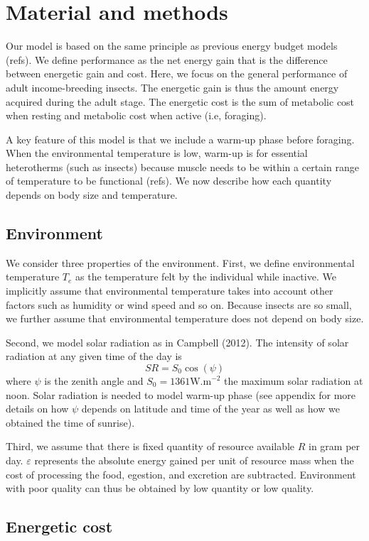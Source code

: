 \section*{Material and methods}
Our model is based on the same principle as previous energy budget models (refs).
We define performance as the net energy gain that is the difference between energetic gain and cost.
Here, we focus on the general performance of adult income-breeding insects. 
The energetic gain is thus the amount energy acquired during the adult stage.
The energetic cost is the sum of metabolic cost when resting and metabolic cost when active (i.e, foraging).

A key feature of this model is that we include a warm-up phase before foraging.
When the environmental temperature is low, warm-up is for essential heterotherms (such as insects) because muscle needs to be within a certain range of temperature to be functional (refs).
We now describe how each quantity depends on body size and temperature.

\subsection*{Environment}
We consider three properties of the environment. 
First, we define environmental temperature $T_e$ as the temperature felt by the individual while inactive.
We implicitly assume that environmental temperature takes into account other factors such as humidity or wind speed and so on.
Because insects are so small, we further assume that environmental temperature does not depend on body size.

Second, we model solar radiation as in Campbell (2012).
The intensity of solar radiation at any given time of the day is \[SR = S_0 \cos(\psi) \]
where $\psi$ is the zenith angle and $S_0 = 1361 \mbox{W.m}^{-2}$ the maximum solar radiation at noon.
Solar radiation is needed to model warm-up phase (see appendix for more details on how $\psi$ depends on latitude and time of the year as well as how we obtained the time of sunrise).

Third, we assume that there is fixed quantity of resource available $R$ in gram per day.
$\varepsilon$ represents the absolute energy gained per unit of resource mass when the cost of processing the food, egestion, and excretion are subtracted. 
Environment with poor quality can thus be obtained by low quantity or low quality.

\subsection*{Energetic cost}
